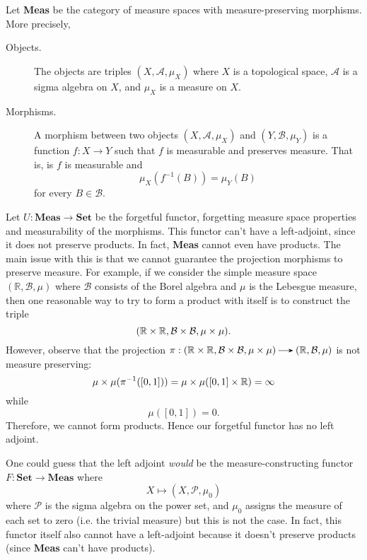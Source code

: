     \begin{example}
        Let \textbf{Meas} be the category of measure spaces with measure-preserving 
        morphisms. 
        More precisely, 
        \begin{description}
            \item[Objects.] The objects are triples $(X, \mathcal{A}, \mu_X)$ 
            where $X$ is a topological space, $\mathcal{A}$ is a sigma algebra 
            on $X$, and $\mu_X$ is a measure on $X$. 
            
            \item[Morphisms.] A morphism between two objects $(X, \mathcal{A}, \mu_X)$ 
            and $(Y, \mathcal{B}, \mu_Y)$ is a function $f: X \to Y$ such that 
            $f$ is measurable and preserves measure. That is, is $f$ is measurable 
            and 
            \[
                \mu_X(f^{-1}(B)) = \mu_Y(B)
            \] 
            for every $B \in \mathcal{B}$. 
        \end{description}

        Let $U: \textbf{Meas} \to \textbf{Set}$ be the forgetful functor, forgetting 
        measure space properties and measurability of the morphisms. 
        This functor can't have a left-adjoint, since it does not preserve 
        products. In fact, \textbf{Meas} cannot even have products. 
        The main issue with this is that we cannot guarantee the projection 
        morphisms to preserve measure. For example, if we consider the 
        simple measure space $(\mathbb{R}, \mathcal{B}, \mu)$ where $\mathcal{B}$ consists 
        of the Borel algebra and $\mu$ is the Lebesgue measure, then 
        one reasonable way to try to form a product with itself is to construct the triple
        \[
            (\mathbb{R} \times \mathbb{R}, \mathcal{B} \times \mathcal{B}, \mu\times\mu). 
        \]
        However, observe that the projection $\pi: (\rr \times \rr, \mathcal{B} \times \mathcal{B}, \mu\times\mu) \to (\rr, \mathcal{B}, \mu)$ is 
        not measure preserving:
        \[
            \mu \times \mu(\pi^{-1}([0, 1])) = \mu \times \mu([0, 1] \times \mathbb{R}) = \infty
        \]
        while 
        \[
            \mu([0, 1]) = 0.            
        \]
        Therefore, we cannot form products. Hence our forgetful functor 
        has no left adjoint. 
        
        One could guess that the left adjoint \textit{would} be the 
        measure-constructing functor $F: \textbf{Set} \to \textbf{Meas}$ where 
        \[
            X \mapsto (X, \mathcal{P}, \mu_0)
        \]
        where $\mathcal{P}$ is the sigma algebra on the power set, and $\mu_0$ assigns
        the measure of each set to zero (i.e. the trivial measure) but this is not
        the case. In fact, this functor itself also cannot have a left-adjoint 
        because it doesn't preserve products 
        (since \textbf{Meas} can't have products).


    \end{example}

